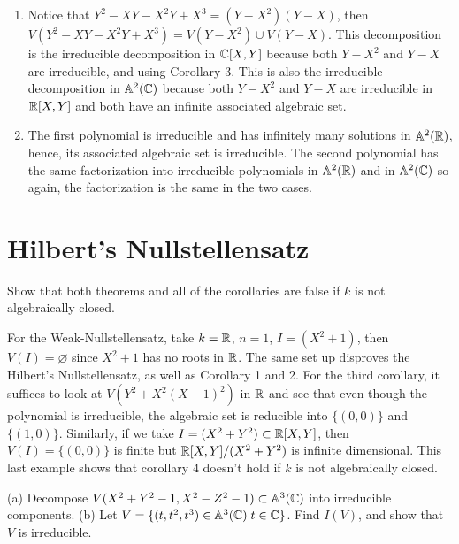 \begin{solution}
    \begin{enumerate}[label=(\alph*)]
        \item Notice that $Y^2 - XY - X^2Y + X^3 = (Y-X^2)(Y-X)$, then $V(Y^2 - XY - X^2Y + X^3) = V(Y-X^2) \cup V(Y-X)$. This decomposition is the irreducible decomposition in $\mathbb{C}[X,Y]$ because both $Y-X^2$ and $Y-X$ are irreducible, and using Corollary 3. This is also the irreducible decomposition in $\mathbb{A}^2(\mathbb{C})$ because both $Y-X^2$ and $Y-X$ are irreducible in $\mathbb{R}[X,Y]$ and both have an infinite associated algebraic set.
        \item The first polynomial is irreducible and has infinitely many solutions in $\mathbb{A}^2(\mathbb{R})$, hence, its associated algebraic set is irreducible. The second polynomial has the same factorization into irreducible polynomials in $\mathbb{A}^2(\mathbb{R})$ and in $\mathbb{A}^2(\mathbb{C})$ so again, the factorization is the same in the two cases. \\
    \end{enumerate}
\end{solution}

\section{Hilbert's Nullstellensatz}

\begin{exercise}
    Show that both theorems and all of the corollaries are false if $k$ is not algebraically closed. \\
\end{exercise}

\begin{solution}
    For the Weak-Nullstellensatz, take $k = \mathbb{R}$, $n = 1$, $I = (X^2 + 1)$, then $V(I) = \varnothing$ since $X^2 + 1$ has no roots in $\mathbb{R}$. The same set up disproves the Hilbert's Nullstellensatz, as well as Corollary 1 and 2. For the third corollary, it suffices to look at $V(Y^2 + X^2(X-1)^2)$ in $\mathbb{R}$ and see that even though the polynomial is irreducible, the algebraic set is reducible into $\{(0,0)\}$ and $\{(1,0)\}$. Similarly, if we take $I = (X^2 + Y^2) \subset \mathbb{R}[X,Y]$, then $V(I) = \{(0,0)\}$ is finite but $\mathbb{R}[X,Y]/(X^2 + Y^2)$ is infinite dimensional. This last example shows that corollary 4 doesn't hold if $k$ is not algebraically closed. \\
\end{solution}

\begin{exercise}
    (a) Decompose $V(X^2 + Y^2 - 1, X^2 - Z^2 - 1) \subset \mathbb{A}^3(\mathbb{C})$ into irreducible components. (b) Let $V = \{(t,t^2, t^3) \in \mathbb{A}^3(\mathbb{C}) | t \in \mathbb{C}\}$. Find $I(V)$, and show that $V$ is irreducible.  \\
\end{exercise}

